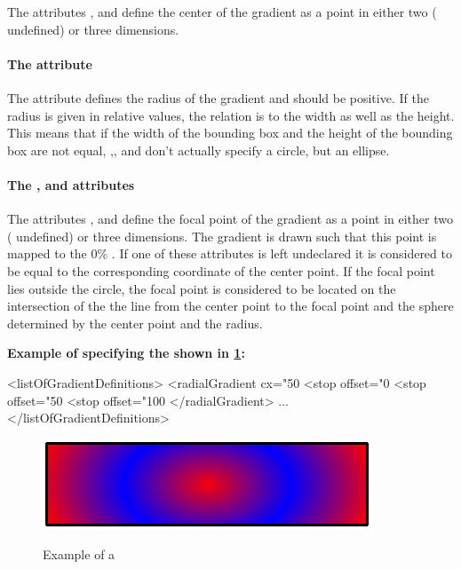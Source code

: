 The attributes ,  and  define the center of the gradient as a point in either two ( undefined) or three dimensions.


\paragraph{The \fixttspace{} attribute}

The attribute  defines the radius of the gradient and should be positive. If the radius is given in relative values, the relation is to the width as well as the height. This means that 
if the width of the bounding box and the height of the bounding box are not equal, ,,
and  don't actually specify a circle, but an ellipse.

\paragraph{The \fixttspace{}, \fixttspace{} and \fixttspace{} attributes}

The attributes ,  and  define the focal point of the gradient as a point in either two ( undefined) or three dimensions. The gradient is drawn such that this point is mapped to the 0\% \GradientStop. If one of these attributes is left undeclared it is considered to be equal to the corresponding coordinate of the center point. If the focal point lies outside 
the circle, the focal point is considered to be located on the intersection of the the line from the center
point to the focal point and the sphere determined by the center point and the radius.


  {\bf
Example of specifying the \RadialGradient shown in \ref{fig:radgrad}:
}

{\footnotesize
\begin{example}
<listOfGradientDefinitions>
  <radialGradient cx="50%
    <stop offset="0%
    <stop offset="50%
    <stop offset="100%
  </radialGradient>
       ...
</listOfGradientDefinitions>
\end{example}
}

\begin{figure}[h!]
  \centering
  \includegraphics{figures/radgrad01.pdf}\\
  \caption{Example of a \RadialGradient}
  \label{fig:radgrad}
\end{figure}



